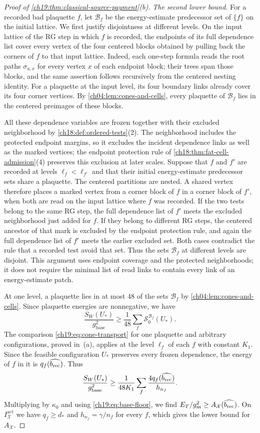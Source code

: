 \begin{proof}[Proof of \cref{ch19:thm:classical-source-payment}(b)]
\emph{The second lower bound.} For a recorded bad plaquette $f$, let $\mathcal B_f$ be the energy-estimate predecessor set of $\{f\}$ on the initial lattice. We first justify disjointness at different levels. On the input lattice of the RG step in which $f$ is recorded, the endpoints of its full dependence list cover every vertex of the four centered blocks obtained by pulling back the corners of $f$ to that input lattice. Indeed, each one-step formula reads the root paths $\sigma_{a,x}$ for every vertex $x$ of each endpoint block; their trees span those blocks, and the same assertion follows recursively from the centered nesting identity. For a plaquette at the input level, its four boundary links already cover its four corner vertices. By \cref{ch04:lem:cones-and-cells}, every plaquette of $\mathcal B_f$ lies in the centered preimages of these blocks.

All these dependence variables are frozen together with their excluded neighborhood by \cref{ch18:def:ordered-tests}(2). The neighborhood includes the protected endpoint margins, so it excludes the incident dependence links as well as the marked vertices; the endpoint protection rule of \cref{ch18:thm:fat-cell-admission}(4) preserves this exclusion at later scales. Suppose that $f$ and $f'$ are recorded at levels $\ell_f<\ell_{f'}$ and that their initial energy-estimate predecessor sets share a plaquette. The centered partitions are nested. A shared vertex therefore places a marked vertex from a corner block of $f$ in a corner block of $f'$, when both are read on the input lattice where $f$ was recorded. If the two tests belong to the same RG step, the full dependence list of $f'$ meets the excluded neighborhood just added for $f$. If they belong to different RG steps, the centered ancestor of that mark is excluded by the endpoint protection rule, and again the full dependence list of $f'$ meets the earlier excluded set. Both cases contradict the rule that a recorded test avoid that set. Thus the sets $\mathcal B_f$ at different levels are disjoint. This argument uses endpoint coverage and the protected neighborhoods; it does not require the minimal list of read links to contain every link of an energy-estimate patch.

At one level, a plaquette lies in at most $48$ of the sets $\mathcal B_f$ by \cref{ch04:lem:cones-and-cells}. Since plaquette energies are nonnegative, we have
\[
 \frac{S_W(U_*)}{g_{\mathrm{base}}^2}\ge\frac1{48}\sum_f\mathcal S_0^{\mathcal B_f}(U_*).
\]
The comparison \eqref{ch19:eq:cone-transport} for one plaquette and arbitrary configurations, proved in~(a), applies at the level $\ell_f$ of each $f$ with constant $K_1$. Since the feasible configuration $U_*$ preserves every frozen dependence, the energy of $f$ in it is $q_f(\widehat{b_{\mathrm{rec}}})$. Thus
\[
 \frac{S_W(U_*)}{g_{\mathrm{base}}^2}\ge\frac1{48K_1}\sum_f\frac{4q_f(\widehat{b_{\mathrm{rec}}})}{h_{n_f}}.
\]
Multiplying by $\kappa_0$ and using \eqref{ch19:eq:base-floor}, we find $E_T/g_m^2\ge A_{\mathcal X}(\widehat{b_{\mathrm{rec}}})$. On $I_{\mathcal X}^{\mathrm{act}}$ we have $q_f\ge d_*$ and $h_{n_f}=\gamma/n_f$ for every $f$, which gives the lower bound for $A_{\mathcal X}$.
\end{proof}

